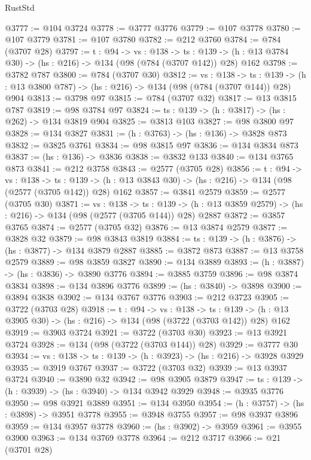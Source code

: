 \begin{lexlean}{RustStd}
\begin{coremodule}
@3777 := @104 @3724
@3778 := @3777 @3776
@3779 := @107 @3778
@3780 := @107 @3779
@3781 := @107 @3780
@3782 := @212 @3760
@3784 := @784 (@3707 @28)
@3797 := {t : @94} ->
  {vs : @138} ->
  {ts : @139} -> (h : @13 @3784 @30) -> (hs : @216) -> @134 (@98 (@784 (@3707 @142)) @28) @162
@3798 := @3782 @787
@3800 := @784 (@3707 @30)
@3812 := {vs : @138} ->
  {ts : @139} -> (h : @13 @3800 @787) -> (hs : @216) -> @134 (@98 (@784 (@3707 @144)) @28) @904
@3813 := @3798 @97
@3815 := @784 (@3707 @32)
@3817 := @13 @3815 @787
@3819 := @98 @3784 @97
@3824 := {ts : @139} -> (h : @3817) -> (hs : @262) -> @134 @3819 @904
@3825 := @3813 @103
@3827 := @98 @3800 @97
@3828 := @134 @3827
@3831 := (h : @3763) -> (hs : @136) -> @3828 @873
@3832 := @3825 @3761
@3834 := @98 @3815 @97
@3836 := @134 @3834 @873
@3837 := (hs : @136) -> @3836
@3838 := @3832 @133
@3840 := @134 @3765 @873
@3841 := @212 @3758
@3843 := @2577 (@3705 @28)
@3856 := {t : @94} ->
  {vs : @138} ->
  {ts : @139} -> (h : @13 @3843 @30) -> (hs : @216) -> @134 (@98 (@2577 (@3705 @142)) @28) @162
@3857 := @3841 @2579
@3859 := @2577 (@3705 @30)
@3871 := {vs : @138} ->
  {ts : @139} -> (h : @13 @3859 @2579) -> (hs : @216) -> @134 (@98 (@2577 (@3705 @144)) @28) @2887
@3872 := @3857 @3765
@3874 := @2577 (@3705 @32)
@3876 := @13 @3874 @2579
@3877 := @3828 @32
@3879 := @98 @3843 @3819
@3884 := {ts : @139} -> (h : @3876) -> (hs : @3877) -> @134 @3879 @2887
@3885 := @3872 @873
@3887 := @13 @3758 @2579
@3889 := @98 @3859 @3827
@3890 := @134 @3889
@3893 := (h : @3887) -> (hs : @3836) -> @3890 @3776
@3894 := @3885 @3759
@3896 := @98 @3874 @3834
@3898 := @134 @3896 @3776
@3899 := (hs : @3840) -> @3898
@3900 := @3894 @3838
@3902 := @134 @3767 @3776
@3903 := @212 @3723
@3905 := @3722 (@3703 @28)
@3918 := {t : @94} ->
  {vs : @138} ->
  {ts : @139} -> (h : @13 @3905 @30) -> (hs : @216) -> @134 (@98 (@3722 (@3703 @142)) @28) @162
@3919 := @3903 @3724
@3921 := @3722 (@3703 @30)
@3923 := @13 @3921 @3724
@3928 := @134 (@98 (@3722 (@3703 @144)) @28)
@3929 := @3777 @30
@3934 := {vs : @138} -> {ts : @139} -> (h : @3923) -> (hs : @216) -> @3928 @3929
@3935 := @3919 @3767
@3937 := @3722 (@3703 @32)
@3939 := @13 @3937 @3724
@3940 := @3890 @32
@3942 := @98 @3905 @3879
@3947 := {ts : @139} -> (h : @3939) -> (hs : @3940) -> @134 @3942 @3929
@3948 := @3935 @3776
@3950 := @98 @3921 @3889
@3951 := @134 @3950
@3954 := (h : @3757) -> (hs : @3898) -> @3951 @3778
@3955 := @3948 @3755
@3957 := @98 @3937 @3896
@3959 := @134 @3957 @3778
@3960 := (hs : @3902) -> @3959
@3961 := @3955 @3900
@3963 := @134 @3769 @3778
@3964 := @212 @3717
@3966 := @21 (@3701 @28)

\end{coremodule}
\end{lexlean}
